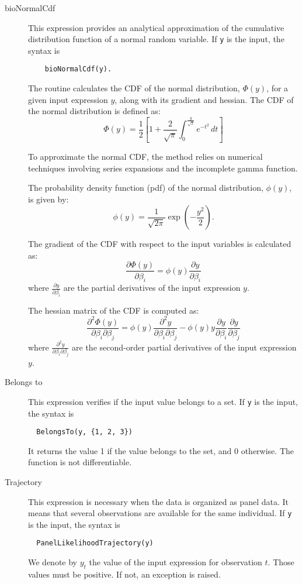 \documentclass[12pt,a4paper]{article}
\begin{document}
\begin{description}
\item[bioNormalCdf] This expression provides an analytical approximation of the cumulative distribution function of a normal random variable. If \lstinline+y+ is the input, the syntax is
  \begin{lstlisting}
    bioNormalCdf(y).
  \end{lstlisting}
The routine calculates the CDF of the normal distribution, $\Phi(y)$, for a given input expression $y$, along with its gradient and hessian. The CDF of the normal distribution is defined as:
\[
\Phi(y) = \frac{1}{2} \left[ 1 + \frac{2}{\sqrt{\pi}} \int_0^{\frac{y}{\sqrt{2}}} e^{-t^2} \, dt \right]
\]

To approximate the normal CDF, the method relies on numerical
techniques involving series expansions and the incomplete gamma
function.

The probability density function (pdf) of the normal distribution, $\phi(y)$, is given by:
\[
\phi(y) = \frac{1}{\sqrt{2\pi}} \exp\left( -\frac{y^2}{2} \right).
\]

The gradient of the CDF with respect to the input variables is calculated as:
\[
\frac{\partial \Phi(y)}{\partial \beta_i} = \phi(y) \frac{\partial y}{\partial \beta_i}
\]
where $\frac{\partial y}{\partial \beta_i}$ are the partial derivatives of the input expression $y$.

The hessian matrix of the CDF is computed as:
\[
\frac{\partial^2 \Phi(y)}{\partial \beta_i \partial \beta_j} = \phi(y) \frac{\partial^2 y}{\partial \beta_i \partial \beta_j} - \phi(y) y \frac{\partial y}{\partial \beta_i} \frac{\partial y}{\partial \beta_j}
\]
where $\frac{\partial^2 y}{\partial \beta_i \partial \beta_j}$ are the second-order partial derivatives of the input expression $y$.


\item[Belongs to] This expression verifies if the input value belongs to a set. 
If \lstinline+y+ is the input, the syntax is
\begin{lstlisting}
  BelongsTo(y, {1, 2, 3})
\end{lstlisting}
It returns the value 1 if the value belongs to the set, and 0 otherwise. The function is not differentiable.

\item[Trajectory] This expression is necessary when the data is organized as panel data. It means that several observations are available for the same individual.
If \lstinline+y+ is the input, the syntax is
\begin{lstlisting}
  PanelLikelihoodTrajectory(y)
\end{lstlisting}
We denote by $y_t$ the value of the input expression for observation $t$. Those values must be positive. If not, an exception is raised.


\end{description}
\end{document}
